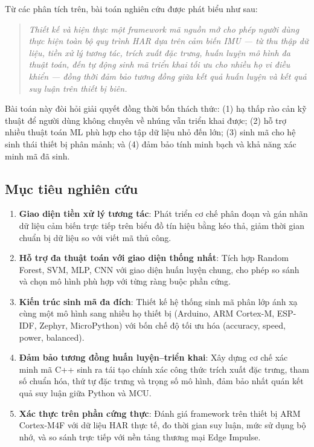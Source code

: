 Từ các phân tích trên, bài toán nghiên cứu được phát biểu như sau:

\begin{quote}
\textit{Thiết kế và hiện thực một framework mã nguồn mở cho phép người dùng thực hiện toàn bộ quy trình HAR dựa trên cảm biến IMU --- từ thu thập dữ liệu, tiền xử lý tương tác, trích xuất đặc trưng, huấn luyện mô hình đa thuật toán, đến tự động sinh mã triển khai tối ưu cho nhiều họ vi điều khiển --- đồng thời đảm bảo tương đồng giữa kết quả huấn luyện và kết quả suy luận trên thiết bị biên.}
\end{quote}

Bài toán này đòi hỏi giải quyết đồng thời bốn thách thức: (1) hạ thấp rào cản kỹ thuật để người dùng không chuyên về nhúng vẫn triển khai được; (2) hỗ trợ nhiều thuật toán ML phù hợp cho tập dữ liệu nhỏ đến lớn; (3) sinh mã cho hệ sinh thái thiết bị phân mảnh; và (4) đảm bảo tính minh bạch và khả năng xác minh mã đã sinh.

\subsection{Mục tiêu nghiên cứu}

\begin{enumerate}
\item \textbf{Giao diện tiền xử lý tương tác}: Phát triển cơ chế phân đoạn và gán nhãn dữ liệu cảm biến trực tiếp trên biểu đồ tín hiệu bằng kéo thả, giảm thời gian chuẩn bị dữ liệu so với viết mã thủ công.

\item \textbf{Hỗ trợ đa thuật toán với giao diện thống nhất}: Tích hợp Random Forest, SVM, MLP, CNN với giao diện huấn luyện chung, cho phép so sánh và chọn mô hình phù hợp với từng ràng buộc phần cứng.

\item \textbf{Kiến trúc sinh mã đa đích}: Thiết kế hệ thống sinh mã phân lớp ánh xạ cùng một mô hình sang nhiều họ thiết bị (Arduino, ARM Cortex-M, ESP-IDF, Zephyr, MicroPython) với bốn chế độ tối ưu hóa (accuracy, speed, power, balanced).

\item \textbf{Đảm bảo tương đồng huấn luyện--triển khai}: Xây dựng cơ chế xác minh mã C++ sinh ra tái tạo chính xác công thức trích xuất đặc trưng, tham số chuẩn hóa, thứ tự đặc trưng và trọng số mô hình, đảm bảo nhất quán kết quả suy luận giữa Python và MCU.

\item \textbf{Xác thực trên phần cứng thực}: Đánh giá framework trên thiết bị ARM Cortex-M4F với dữ liệu HAR thực tế, đo thời gian suy luận, mức sử dụng bộ nhớ, và so sánh trực tiếp với nền tảng thương mại Edge Impulse.
\end{enumerate}


